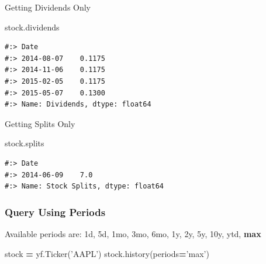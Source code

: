 \documentclass[
]{book}
\newenvironment{Shaded}{\begin{snugshade}}{\end{snugshade}}
\newcommand{\NormalTok}[1]{#1}
\newcommand{\OperatorTok}[1]{\textcolor[rgb]{0.43,0.43,0.43}{\textbf{#1}}}
\newcommand{\StringTok}[1]{\textcolor[rgb]{0.5,0.5,0.5}{#1}}
\begin{document}
Getting Dividends Only

\begin{Shaded}
\begin{Highlighting}[]
\NormalTok{stock.dividends}
\end{Highlighting}
\end{Shaded}

\begin{verbatim}
#:> Date
#:> 2014-08-07    0.1175
#:> 2014-11-06    0.1175
#:> 2015-02-05    0.1175
#:> 2015-05-07    0.1300
#:> Name: Dividends, dtype: float64
\end{verbatim}

Getting Splits Only

\begin{Shaded}
\begin{Highlighting}[]
\NormalTok{stock.splits}
\end{Highlighting}
\end{Shaded}

\begin{verbatim}
#:> Date
#:> 2014-06-09    7.0
#:> Name: Stock Splits, dtype: float64
\end{verbatim}

\hypertarget{query-using-periods}{%
\subsubsection{Query Using Periods}\label{query-using-periods}}

Available periods are: 1d, 5d, 1mo, 3mo, 6mo, 1y, 2y, 5y, 10y, ytd, \textbf{max}

\begin{Shaded}
\begin{Highlighting}[]
\NormalTok{stock }\OperatorTok{=}\NormalTok{ yf.Ticker(}\StringTok{'AAPL'}\NormalTok{)}
\NormalTok{stock.history(periods}\OperatorTok{=}\StringTok{'max'}\NormalTok{)}
\end{Highlighting}
\end{Shaded}
\end{document}
